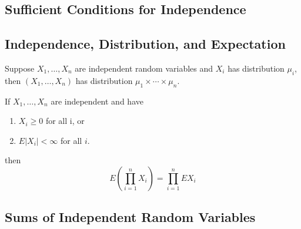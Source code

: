\subsection{Sufficient Conditions for Independence}

\subsection{Independence, Distribution, and Expectation}

\begin{theorem}{}{}
    Suppose $X_{1},\ldots,X_{n}$ are independent random variables and $X_{i}$ has distribution $\mu_{i}$, then $\left(X_{1},\ldots,X_{n}\right)$ has distribution $\mu_{1}\times\cdots\times\mu_{n}$.
\end{theorem}

\begin{theorem}{}{}
    If $X_{1},\ldots,X_{n}$ are independent and have
    \begin{enumerate}
        \item $X_{i} \geq 0$ for all i, or
        \item $E\left|X_{i}\right|<\infty$ for all $i$.
    \end{enumerate}
    then
    \begin{equation}
        E\left(\prod_{i=1}^{n}X_{i}\right)=\prod_{i=1}^{n}EX_{i}
    \end{equation}
\end{theorem}

\subsection{Sums of Independent Random Variables}

